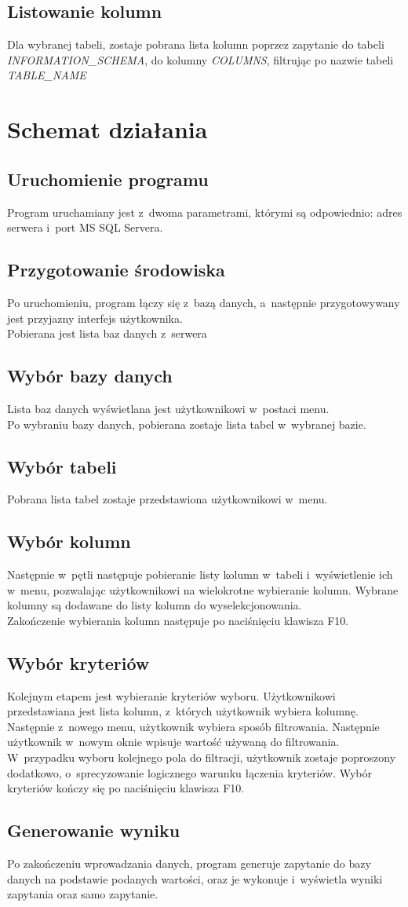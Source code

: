 \documentclass[a4paper,12pt]{article}
\begin{document}
\subsection{Listowanie kolumn}
Dla wybranej tabeli, zostaje pobrana lista kolumn poprzez zapytanie do tabeli \textit{INFORMATION\_SCHEMA}, do kolumny \textit{COLUMNS}, filtrując po nazwie tabeli \textit{TABLE\_NAME}
\section{Schemat działania}
\subsection{Uruchomienie programu}
Program uruchamiany jest z~dwoma parametrami, którymi są odpowiednio: adres serwera i~port MS SQL Servera.
\subsection{Przygotowanie środowiska}
Po uruchomieniu, program łączy się z~bazą danych, a~następnie przygotowywany jest przyjazny interfejs użytkownika.\\
Pobierana jest lista baz danych z~serwera
\subsection{Wybór bazy danych}
Lista baz danych wyświetlana jest użytkownikowi w~postaci menu.\\
Po wybraniu bazy danych, pobierana zostaje lista tabel w~wybranej bazie.\\
\subsection{Wybór tabeli}
Pobrana lista tabel zostaje przedstawiona użytkownikowi w~menu.
\subsection{Wybór kolumn}
Następnie w~pętli następuje pobieranie listy kolumn w~tabeli i~wyświetlenie ich w~menu, pozwalając użytkownikowi na wielokrotne wybieranie kolumn.
Wybrane kolumny są dodawane do listy kolumn do wyselekcjonowania.\\
Zakończenie wybierania kolumn następuje po naciśnięciu klawisza F10.\\
\subsection{Wybór kryteriów}
Kolejnym etapem jest wybieranie kryteriów wyboru. Użytkownikowi przedstawiana jest lista kolumn, z~których użytkownik wybiera kolumnę. Następnie z~nowego menu, użytkownik wybiera sposób filtrowania.
Następnie użytkownik w~nowym oknie wpisuje wartość używaną do filtrowania.\\
W~przypadku wyboru kolejnego pola do filtracji, użytkownik zostaje poproszony dodatkowo, o~sprecyzowanie logicznego warunku łączenia kryteriów.
Wybór kryteriów kończy się po naciśnięciu klawisza F10.\\
\subsection{Generowanie wyniku}
Po zakończeniu wprowadzania danych, program generuje zapytanie do bazy danych na podstawie podanych wartości, oraz je wykonuje i~wyświetla wyniki zapytania oraz samo zapytanie.
\end{document}
